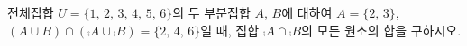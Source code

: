전체집합 $U=\{1,\,2,\,3,\,4,\,5,\,6\}$의 두 부분집합 $A$, $B$에 대하여 $A=\{2,\,3\}$, $(A\cup B)\cap(\comp{A}\cup\comp{B})=\{2,\,4,\,6\}$일 때, 집합 $\comp{A}\cap\comp{B}$의 모든 원소의 합을 구하시오.

